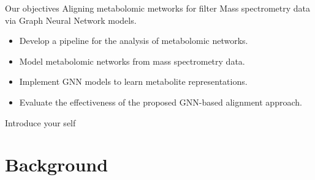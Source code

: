 \documentclass[aspectratio=169]{beamer}
\begin{document}
    \begin{frame}{Our objectives}
        Aligning metabolomic metworks for filter Mass spectrometry data via Graph Neural Network models.


        \begin{itemize}

            \item Develop a pipeline for the analysis of metabolomic networks.
            \item Model metabolomic networks from mass spectrometry data.
            \item Implement GNN models to learn metabolite representations. %
            \item Evaluate the effectiveness of the proposed GNN-based alignment approach.
        \end{itemize}

        \begin{note}
            {Introduce your self}
        \end{note}
    \end{frame}

\section{Background}
\end{document}
